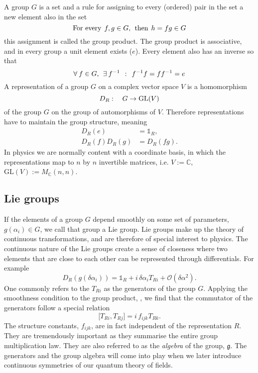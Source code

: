 A group $G$ is a set and a rule for assigning to every (ordered) pair in the set
a new element also in the set
%
\begin{equation}
  \text{For every} \hskip1ex f, g \in G, \hskip1ex\text{then}\hskip1ex
    h = fg \in G
\end{equation}
%
this assignment is called the group product. The group product is associative,
and in every group a unit element exists ($e$). Every element also has an inverse so
that
%
\begin{equation}
  \forall\hskip.5ex f \in G, \hskip1ex\exists\hskip.5ex f^{-1}
    \hskip1ex:\hskip1ex f^{-1} f = f f^{-1} = e
\end{equation}
%
A representation of a group $G$ on a complex vector space $V$ is a homomorphism
%
\begin{equation}
  D_{R}:\hskip1em G \to \text{GL}(V)
\end{equation}
%
of the group $G$ on the group of automorphisms of $V$. Therefore representations
have to maintain the group structure, meaning
%
\begin{align}
  D_R(e) &= \mathbb{1}_R,\\
  D_R(f) D_R(g) &= D_R(fg). \label{eq:group_prod}
\end{align}
%
In physics we are normally content with a coordinate basis, in which the
representations map to $n$ by $n$ invertible matrices, i.e. $V := \mathbb{C}$,
$\text{GL}(V) := M_{\mathbb{C}}(n,n)$.

\subsection{Lie groups}

If the elements of a group $G$ depend smoothly on some set of parameters,
$g(\alpha_i) \in G$, we call that group a Lie group. Lie groups make up the
theory of continuous transformations, and are therefore of special interest to
physics. The continuous nature of the Lie groups create a sense of closeness
where two elements that are close to each other can be represented through
differentials. For example
%
\begin{equation}
  D_R(g(\delta\alpha_i)) = \mathbb{1}_R + i\, \delta \alpha_i T_{Ri} +
    \mathcal{O}(\delta \alpha^2).
\end{equation}
%
One commonly refers to the $T_{Ri}$ as the generators of the group $G$. Applying
the smoothness condition to the group product, ,
we find that the commutator of the generators follow a special relation
%
\begin{equation}
  \big[ T_{Ri}, T_{Rj} \big] = i\, f_{ijk} T_{Rk}.
\end{equation}
%
The structure constants, $f_{ijk}$, are in fact independent of the
representation $R$. They are tremendously important as they summarise the entire
group multiplication law. They are also referred to as the \emph{algebra} of the
group, $\mathfrak{g}$. The generators and the group algebra will come into play
when we later introduce continuous symmetries of our quantum theory of fields.

